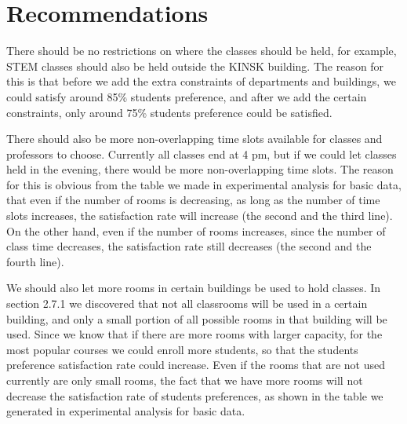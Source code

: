 \documentclass[11pt, oneside]{article}   	%
\begin{document}

\section{Recommendations}
There should be no restrictions on where the classes should be held, for example, STEM classes should also be held outside the KINSK building. The reason for this is that before we add the extra constraints of departments and buildings, we could satisfy around 85\% students preference, and after we add the certain constraints, only around 75\% students preference could be satisfied.

There should also be more non-overlapping time slots available for classes and professors to choose. Currently all classes end at 4 pm, but if we could let classes held in the evening, there would be more non-overlapping time slots. The reason for this is obvious from the table we made in experimental analysis for basic data, that even if the number of rooms is decreasing, as long as the number of time slots increases, the satisfaction rate will increase (the second and the third line). On the other hand, even if the number of rooms increases, since the number of class time decreases, the satisfaction rate still decreases (the second and the fourth line).

We should also let more rooms in certain buildings be used to hold classes. In section 2.7.1 we discovered that not all classrooms will be used in a certain building, and only a small portion of all possible rooms in that building will be used. Since we know that if there are more rooms with larger capacity, for the most popular courses we could enroll more students, so that the students preference satisfaction rate could increase. Even if the rooms that are not used currently are only small rooms, the fact that we have more rooms will not decrease the satisfaction rate of students preferences, as shown in the table we generated in experimental analysis for basic data. 
\end{document}
